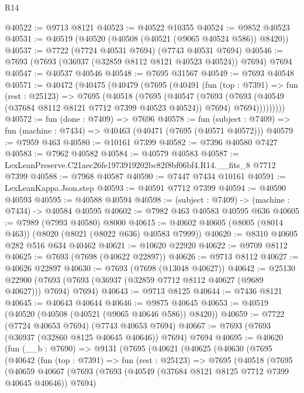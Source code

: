 \begin{lexlean}{R14}
\begin{coremodule}
@40522 := @9713 @8121
@40523 := @40522 @10355
@40524 := @9852 @40523
@40531 := @40519 (@40520 (@40508 (@40521 (@9065 @40524 @586)) @8420))
@40537 := @7722 (@7724 @40531 @7694) (@7743 @40531 @7694)
@40546 := @7693 (@7693 (@36937 (@32859 @8112 @8121 @40523 @40524)) @7694) @7694
@40547 := @40537 @40546
@40548 := @7695 @31567
@40549 := @7693 @40548
@40571 := @40472
    (@40475
      (@40479
        (@7695
          (@40491
            (fun (top : @7391) =>
            fun (rest : @25123) =>
            @7695
              (@40518
                (@7695
                  (@40547
                    (@7693
                      (@7693 (@40549 (@37684 @8112 @8121 @7712 @7399 @40523 @40524)) @7694)
                      @7694)))))))))
@40572 := fun (done : @7409) => @7696
@40578 := fun (subject : @7409) => fun (machine : @7434) => @40463 (@40471 (@7695 (@40571 @40572)))
@40579 := @7959 @463
@40580 := @10161 @7399
@40582 := @7396 @40580 @7427
@40583 := @7962 @40582
@40584 := @40579 @40583
@40587 := LexLeanPreserve.C21aec26fe1973919202bc82f8bf06bf4.R14.__fits_8 @7712 @7399
@40588 := @7968 @40587
@40590 := @7447 @7434 @10161
@40591 := LexLeanKappa.Json.step
@40593 := @40591 @7712 @7399
@40594 := @40590 @40593
@40595 := @40588 @40594
@40598 := (subject : @7409) -> (machine : @7434) -> @40584 @40595
@40602 := @7982 @463 @40583 @40595 @636
@40605 := @7989 (@7993 @40580) @8000
@40615 := @40602 @40605 (@8005 (@8014 @463)) (@8020 (@8021 (@8022 @636) @40583 @7999))
@40620 := @8310 @40605 @282 @516 @634 @40462
@40621 := @10620 @22920
@40622 := @9709 @8112
@40625 := @7693 (@7698 (@40622 @22897))
@40626 := @9713 @8112
@40627 := @40626 @22897
@40630 := @7693 (@7698 (@13048 @40627))
@40642 := @25130
    @22900
    (@7693 (@7693 (@36937 (@32859 @7712 @8112 @40627 (@9689 @40627))) @7694) @7694)
@40643 := @9713 @8125
@40644 := @7436 @8121
@40645 := @40643 @40644
@40646 := @9875 @40645
@40653 := @40519 (@40520 (@40508 (@40521 (@9065 @40646 @586)) @8420))
@40659 := @7722 (@7724 @40653 @7694) (@7743 @40653 @7694)
@40667 := @7693 (@7693 (@36937 (@32860 @8125 @40645 @40646)) @7694) @7694
@40695 := @40620
    (fun (__b : @7690) =>
    @9131
      (@7695
        (@40621
          (@40625
            (@40630
              (@7695
                (@40642
                  (fun (top : @7391) =>
                  fun (rest : @25123) =>
                  @7695
                    (@40518
                      (@7695
                        (@40659
                          @40667
                          (@7693
                            (@7693 (@40549 (@37684 @8121 @8125 @7712 @7399 @40645 @40646)) @7694)

\end{coremodule}
\end{lexlean}
